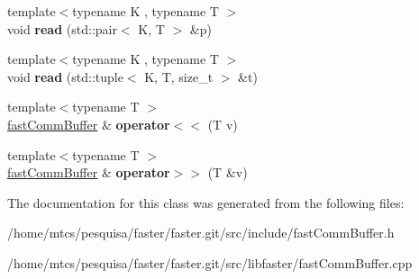 \begin{DoxyCompactItemize}
\item 
\hypertarget{classfaster_1_1fastCommBuffer_aa53c0eac8725e8a0ea773bd027b7be32}{}{\footnotesize template$<$typename K , typename T $>$ }\\void {\bfseries read} (std\+::pair$<$ K, T $>$ \&p)\label{classfaster_1_1fastCommBuffer_aa53c0eac8725e8a0ea773bd027b7be32}

\item 
\hypertarget{classfaster_1_1fastCommBuffer_afe0968b6a32dbafdd87639262e21ea0f}{}{\footnotesize template$<$typename K , typename T $>$ }\\void {\bfseries read} (std\+::tuple$<$ K, T, size\+\_\+t $>$ \&t)\label{classfaster_1_1fastCommBuffer_afe0968b6a32dbafdd87639262e21ea0f}

\item 
\hypertarget{classfaster_1_1fastCommBuffer_a0b4e973082ad897d135a5a454a06623f}{}{\footnotesize template$<$typename T $>$ }\\\hyperlink{classfaster_1_1fastCommBuffer}{fast\+Comm\+Buffer} \& {\bfseries operator$<$$<$} (T v)\label{classfaster_1_1fastCommBuffer_a0b4e973082ad897d135a5a454a06623f}

\item 
\hypertarget{classfaster_1_1fastCommBuffer_a957e261de1a95762b9730a0322f5d341}{}{\footnotesize template$<$typename T $>$ }\\\hyperlink{classfaster_1_1fastCommBuffer}{fast\+Comm\+Buffer} \& {\bfseries operator$>$$>$} (T \&v)\label{classfaster_1_1fastCommBuffer_a957e261de1a95762b9730a0322f5d341}

\end{DoxyCompactItemize}


The documentation for this class was generated from the following files\+:\begin{DoxyCompactItemize}
\item 
/home/mtcs/pesquisa/faster/faster.\+git/src/include/fast\+Comm\+Buffer.\+h\item 
/home/mtcs/pesquisa/faster/faster.\+git/src/libfaster/fast\+Comm\+Buffer.\+cpp\end{DoxyCompactItemize}
